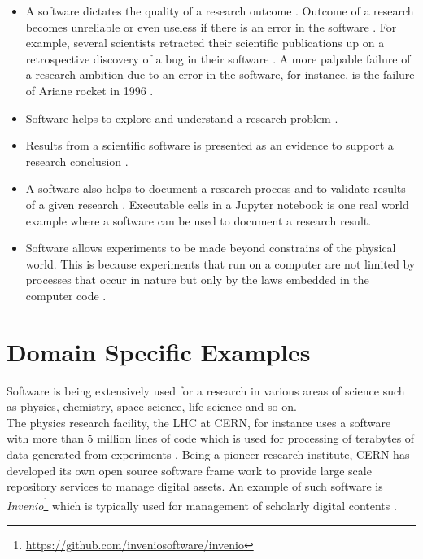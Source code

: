 \begin{itemize}%
	\itemsep0em
	\item A software dictates the quality of a research outcome \citep{hannay2009scientists}. Outcome of a research becomes unreliable or even useless if there is an error in the software \citep{soergel2014rampant}. For example, several scientists retracted their scientific publications up on a retrospective discovery of a bug in their software \citep{wilson2014best,merali2010computational,miller2006scientist}. A more palpable failure of a research ambition due to an error in the software, for instance, is the failure of Ariane rocket in 1996 \citep{garfinkel2005history}.  
	\item Software helps to explore and understand a research problem \citep{hannay2009scientists}.
	\item Results from a scientific software is presented as an evidence to support a research conclusion \citep{kanewala2014testing}. 
	
  
	
	\item A software also helps to document a research process and to validate results of a given research \citep{jay2020software}. Executable cells in a Jupyter notebook is one real world example where a software can be used to document a research result.
	
	\item Software allows experiments to be made beyond constrains of the physical world. This is because experiments that run on a computer are not limited by processes that occur in nature but only by the laws embedded in the computer code \citep{wolfram1984computer}. 

\end{itemize}

\section{Domain Specific Examples}
\label{sec:Roles:Domain}

Software is being extensively used for a research in various areas of science such as physics, chemistry, space science, life science and so on.\\

The physics research facility, the \ac{LHC} at \ac{CERN}, for instance uses a software with more than 5 million lines of code which is used for processing of terabytes of data generated from experiments \citep{storer2017bridging}. Being a pioneer research institute, \ac{CERN} has developed its own open source software frame work to provide large scale repository services to manage digital assets. An example of such software is \emph{Invenio}\footnote{\url{https://github.com/inveniosoftware/invenio}} which is typically used for management of scholarly digital contents \cite{enwiki:1075310021}. \\

